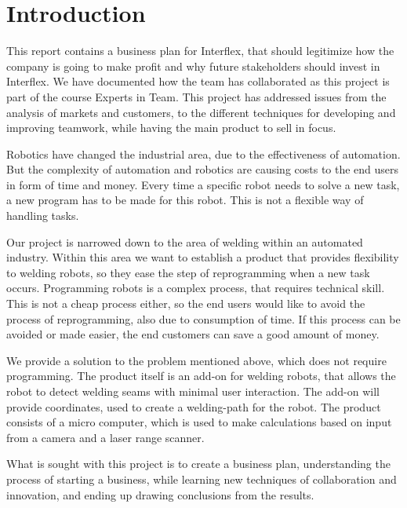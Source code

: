 \section{Introduction}

This report contains a business plan for Interflex, that should legitimize how the company is going to make profit and why future stakeholders should invest in Interflex. 
We have documented how the team has collaborated as this project is part of the course Experts in Team.
This project has addressed issues from the analysis of markets and customers, to the different techniques for developing and improving teamwork, while having the main product to sell in focus.

Robotics have changed the industrial area, due to the effectiveness of automation. But the complexity of automation and robotics are causing costs to the end users in form of time and money. Every time a specific robot needs to solve a new task, a new program has to be made for this robot. This is not a flexible way of handling tasks. 

Our project is narrowed down to the area of welding within an automated industry. Within this area we want to establish a product that provides flexibility to welding robots, so they ease the step of reprogramming when a new task occurs. Programming robots is a complex process, that requires technical skill. This is not a cheap process either, so the end users would like to avoid the process of reprogramming, also due to consumption of time. If this process can be avoided or made easier, the end customers can save a good amount of money. 

We provide a solution to the problem mentioned above, which does not require programming. The product itself is an add-on for welding robots, that allows the robot to detect welding seams with minimal user interaction. The add-on will provide coordinates, used to create a welding-path for the robot. 
The product consists of a micro computer, which is used to make calculations based on input from a camera and a laser range scanner. 

What is sought with this project is to create a business plan, understanding the process of starting a business, while learning new techniques of collaboration and innovation, and ending up drawing conclusions from the results.
